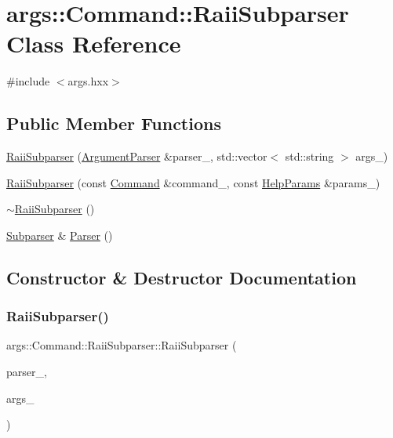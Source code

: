 \hypertarget{classargs_1_1_command_1_1_raii_subparser}{}\section{args\+:\+:Command\+:\+:Raii\+Subparser Class Reference}
\label{classargs_1_1_command_1_1_raii_subparser}


{\ttfamily \#include $<$args.\+hxx$>$}

\subsection*{Public Member Functions}
\begin{DoxyCompactItemize}
\item 
\hyperlink{classargs_1_1_command_1_1_raii_subparser_a41b6def95373292a6015c6090b58f056}{Raii\+Subparser} (\hyperlink{classargs_1_1_argument_parser}{Argument\+Parser} \&parser\+\_\+, std\+::vector$<$ std\+::string $>$ args\+\_\+)
\item 
\hyperlink{classargs_1_1_command_1_1_raii_subparser_a7f6399b9443bec237b3039709f8ed404}{Raii\+Subparser} (const \hyperlink{classargs_1_1_command}{Command} \&command\+\_\+, const \hyperlink{structargs_1_1_help_params}{Help\+Params} \&params\+\_\+)
\item 
\hyperlink{classargs_1_1_command_1_1_raii_subparser_a471cdf0470b69dffdc591f57bab1909c}{$\sim$\+Raii\+Subparser} ()
\item 
\hyperlink{classargs_1_1_subparser}{Subparser} \& \hyperlink{classargs_1_1_command_1_1_raii_subparser_afb1a77227bf65919255fbb6e167f2b95}{Parser} ()
\end{DoxyCompactItemize}


\subsection{Constructor \& Destructor Documentation}
\mbox{\label{classargs_1_1_command_1_1_raii_subparser_a41b6def95373292a6015c6090b58f056}} 
\subsubsection{\texorpdfstring{Raii\+Subparser()}{RaiiSubparser()}\hspace{0.1cm}{\footnotesize\ttfamily [1/2]}}
{\footnotesize\ttfamily args\+::\+Command\+::\+Raii\+Subparser\+::\+Raii\+Subparser (\begin{DoxyParamCaption}\item[{\hyperlink{classargs_1_1_argument_parser}{Argument\+Parser} \&}]{parser\+\_\+,  }\item[{std\+::vector$<$ std\+::string $>$}]{args\+\_\+ }\end{DoxyParamCaption})}

